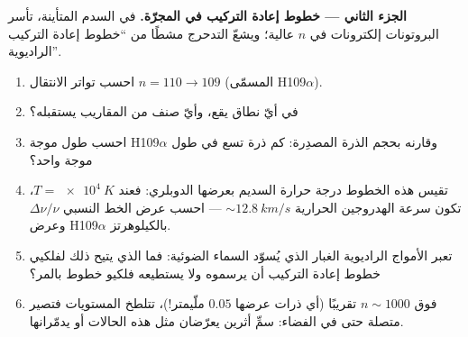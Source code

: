 \begin{problem}
\medskip\noindent\textbf{الجزء الثاني --- خطوط إعادة التركيب في
المجرّة.}
في السدم المتأينة، تأسر البروتونات إلكترونات في $n$ عالية؛ ويشعّ
التدحرج مشطًا من ``خطوط إعادة التركيب الراديوية''.
\begin{enumerate}[resume]
  \item احسب تواتر الانتقال $n = 110 \to 109$
        (المسمّى H109$\alpha$).
  \item في أيّ نطاق يقع، وأيّ صنف من المقاريب
        يستقبله؟
  \item احسب طول موجة H109$\alpha$ وقارنه بحجم
        الذرة المصدِرة: كم ذرة تسع في طول موجة واحد؟
  \item تقيس هذه الخطوط درجة حرارة السديم بعرضها
        الدوبلري: فعند $T = \qty{e4}{K}$، تكون سرعة الهدروجين
        الحرارية $\sim\qty{12.8}{km/s}$ --- احسب عرض الخط النسبي
        $\Delta\nu/\nu$ وعرض H109$\alpha$
        بالكيلوهرتز.
  \item تعبر الأمواج الراديوية الغبار الذي يُسوّد السماء الضوئية:
        فما الذي يتيح ذلك لفلكيي خطوط إعادة التركيب أن يرسموه ولا
        يستطيعه فلكيو خطوط بالمر؟
  \item فوق $n \sim 1000$ تقريبًا (أي ذرات عرضها $0.05$
        ملّيمتر!)، تتلطخ المستويات فتصير متصلة حتى في الفضاء:
        سمِّ أثرين يعرّضان مثل هذه الحالات أو يدمّرانها.
\end{enumerate}


\end{problem}
